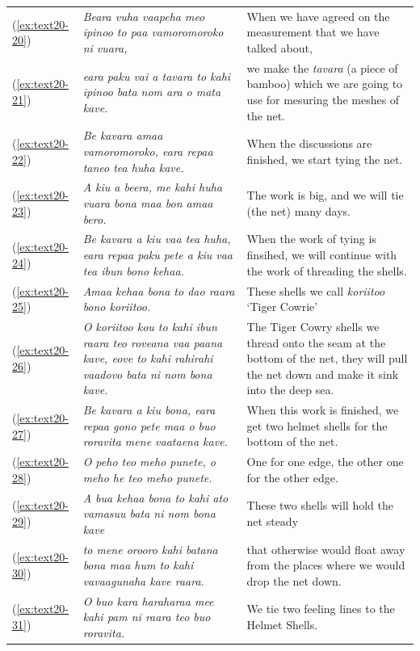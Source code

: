 \documentclass[output=paper]{langscibook}
\begin{document}
\begin{xltabular}{\textwidth}{lXX}
	(\ref{ex:text20-20})&\textit{Beara vuha vaapeha meo ipinoo to paa vamoromoroko ni vuara,}&When we have agreed on the measurement that we have talked about,\\
    (\ref{ex:text20-21})&\textit{eara paku vai a tavara to kahi ipinoo bata nom ara o mata kave.}&we make the \textit{tavara} (a piece of bamboo) which we are going to use for mesuring the meshes of the net.\\
	(\ref{ex:text20-22})&\textit{Be kavara amaa vamoromoroko, eara repaa taneo tea huha kave.}&When the discussions are finished, we start tying the net.\\
	(\ref{ex:text20-23})&\textit{A kiu a beera, me kahi huha vuara bona maa bon amaa bero.}&The work is big, and we will tie (the net) many days.\\
	(\ref{ex:text20-24})&\textit{Be kavara a kiu vaa tea huha, eara repaa paku pete a kiu vaa tea ibun bono kehaa.}&When the work of tying is finsihed, we will continue with the work of threading the shells.\\
	(\ref{ex:text20-25})&\textit{Amaa kehaa bona to dao raara bono koriitoo.}&These shells we call \textit{koriitoo} `Tiger Cowrie'\\
	(\ref{ex:text20-26})&\textit{O koriitoo kou to kahi ibun raara teo roveana vaa paana kave, eove to kahi rahirahi vaadovo bata ni nom bona kave.}&The Tiger Cowry shells we thread onto the seam at the bottom of the net, they will pull the net down and make it sink into the deep sea.\\
	(\ref{ex:text20-27})&\textit{Be kavara a kiu bona, eara repaa gono pete maa o buo roravita mene vaataena kave.}&When this work is finished, we get two helmet shells for the bottom of the net.\\
	(\ref{ex:text20-28})&\textit{O peho teo meho punete, o meho he teo meho punete.}&One for one edge, the other one for the other edge.\\
	(\ref{ex:text20-29})&\textit{A bua kehaa bona to kahi ato vamasuu bata ni nom bona kave}&These two shells will hold the net steady\\
	(\ref{ex:text20-30})&\textit{to mene orooro kahi batana bona maa hum to kahi vavaagunaha kave raara.}&that otherwise would float away from the places where we would drop the net down.\\
	(\ref{ex:text20-31})&\textit{O buo kara haraharaa mee kahi pam ni raara teo buo roravita.}&We tie two feeling lines to the Helmet Shells.\\

\end{xltabular}
\end{document}
